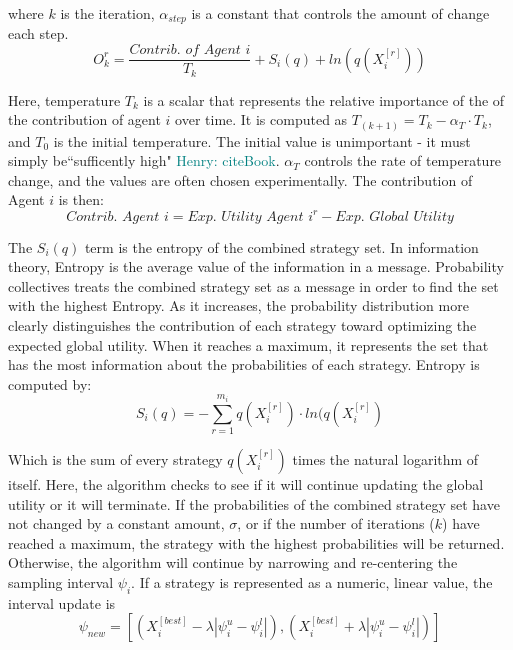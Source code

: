 \documentclass{sig-alternate}
\newcommand{\allcomments}[1]{{#1}}
\newcommand{\hfcomment}[1]{\textcolor{Teal}{\allcomments{Henry: {#1}}}}
\begin{document}
where $k$ is the iteration, $\alpha_{step}$ is a constant that controls the amount of change each step.
	\begin{equation}
	O_k^r = \dfrac{\textit{Contrib. of Agent }i}{T_k}+S_i(q)+ln(q(X_i^{[r]}))
	\end{equation}
	
Here, temperature $T_k$ is a scalar that represents the relative importance of the of the contribution of agent $i$ over time. It is computed as $T_{(k+1)}=T_{k} - \alpha_{T}\cdot T_{k}$, and $T_0$ is the initial temperature. The initial value is unimportant - it must simply be``sufficently high" \hfcomment{cite{Book}}. $\alpha_{T}$ controls the rate of temperature change, and the values are often chosen experimentally.
The contribution of Agent $i$ is then:
	\begin{equation}
	\textit{Contrib. Agent }i = \textit{Exp. Utility Agent }i^r - \textit{Exp. Global Utility}
	\end{equation}
	
The $S_i(q)$ term is the entropy of the combined strategy set. In information theory, Entropy is the average value of the information in a message. Probability collectives treats the combined strategy set as a message in order to find the set with the highest Entropy. As it increases, the probability distribution more clearly distinguishes the contribution of each strategy toward optimizing the expected global utility. When it reaches a maximum, it represents the set that has the most information about the probabilities of each strategy. Entropy is computed by:
	\begin{equation}
	S_i(q)=-\sum_{r=1}^{m_i}q(X_i^{[r]})\cdot ln(q(X_i^{[r]})
	\end{equation}
	
Which is the sum of every strategy $q(X_i^{[r]})$ times the natural logarithm of itself. Here, the algorithm checks to see if it will continue updating the global utility or it will terminate. If the probabilities of the combined strategy set have not changed by a constant amount, $\sigma$, or if the number of iterations ($k$) have reached a maximum, the strategy with the highest probabilities will be returned. Otherwise, the algorithm will continue by narrowing and re-centering the sampling interval $\psi_i$. If a strategy is represented as a numeric, linear value, the interval update is 
	\begin{equation}
	\psi_{new} = [(X_i^{[best]}-\lambda|\psi_i^u - \psi_i^l|),(X_i^{[best]}+\lambda|\psi_i^u - \psi_i^l|)]
	\end{equation}
\end{document}
